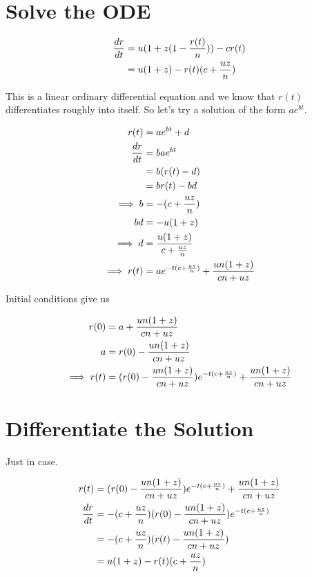 \documentclass{article}
\begin{document}
\section{Solve the ODE}

\begin{align}
    {dr \over dt} &= u(1+z(1-{r(t) \over n}))-cr(t) \\
                  &= u(1+z)-r(t)(c+{uz \over n})
\end{align}

This is a linear ordinary differential equation and we know that $r(t)$ differentiates roughly into itself. So let's try a solution of the form $ae^{bt}$.

\begin{align}
             r(t) &= ae^{bt}+d \\
    {dr \over dt} &= bae^{bt} \\
                  &= b(r(t)-d) \\
                  &= br(t)-bd \\
       \implies b &= -(c+{uz \over n}) \\
               bd &= -u(1+z) \\
       \implies d &= {u(1+z) \over c+{uz \over n}} \\
    \implies r(t) &= ae^{-t(c+{uz \over n})}+{un(1+z) \over cn+uz}
\end{align}

Initial conditions give us

\begin{align}
             r(0) &= a+{un(1+z) \over cn+uz} \\
                a &= r(0)-{un(1+z) \over cn+uz} \\
    \implies r(t) &= (r(0)-{un(1+z) \over cn+uz})e^{-t(c+{uz \over n})}+{un(1+z) \over cn+uz}
\end{align}

\section{Differentiate the Solution}

Just in case.

\begin{align}
             r(t) &= (r(0)-{un(1+z) \over cn+uz})e^{-t(c+{uz \over n})}+{un(1+z) \over cn+uz} \\
    {dr \over dt} &= -(c+{uz \over n})(r(0)-{un(1+z) \over cn+uz})e^{-t(c+{uz \over n})} \\
                  &= -(c+{uz \over n})(r(t)-{un(1+z) \over cn+uz}) \\
                  &= u(1+z)-r(t)(c+{uz \over n})
\end{align}
\end{document}
